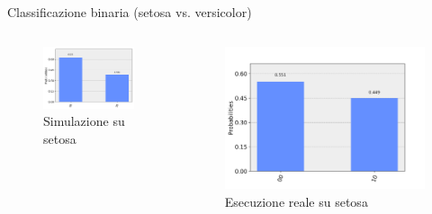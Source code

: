 \documentclass{beamer}
\begin{document}
    \begin{frame}{Classificazione binaria (setosa vs. versicolor)}
        \begin{columns}
            \begin{figure}[h]
                \centering
                \includegraphics[width=\textwidth]{gfx/iris/iris2SetosaVersicolorResult.png}
                \caption{Simulazione su setosa}
                \label{fig:simulazione.setosa}
            \end{figure}
            \begin{figure}[h]
                \centering
                \includegraphics[width=\textwidth]{gfx/misura_setosa_sperimentale.png}
                \caption{Esecuzione reale su setosa}
                \label{fig:esecuzione.setosa}
            \end{figure}
        \end{columns}
    \end{frame}
\end{document}
